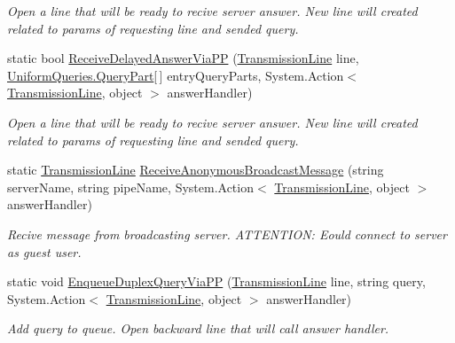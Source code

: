 \begin{DoxyCompactItemize}
\begin{DoxyCompactList}\small\item\em Open a line that will be ready to recive server answer. New line will created related to params of requesting line and sended query. \end{DoxyCompactList}\item 
static bool \mbox{\hyperlink{class_uniform_client_1_1_base_client_a4db768d7c09862ab9adc9d7b0638edc6}{Receive\+Delayed\+Answer\+Via\+PP}} (\mbox{\hyperlink{class_pipes_provider_1_1_client_1_1_transmission_line}{Transmission\+Line}} line, \mbox{\hyperlink{struct_uniform_queries_1_1_query_part}{Uniform\+Queries.\+Query\+Part}}\mbox{[}$\,$\mbox{]} entry\+Query\+Parts, System.\+Action$<$ \mbox{\hyperlink{class_pipes_provider_1_1_client_1_1_transmission_line}{Transmission\+Line}}, object $>$ answer\+Handler)
\begin{DoxyCompactList}\small\item\em Open a line that will be ready to recive server answer. New line will created related to params of requesting line and sended query. \end{DoxyCompactList}\item 
static \mbox{\hyperlink{class_pipes_provider_1_1_client_1_1_transmission_line}{Transmission\+Line}} \mbox{\hyperlink{class_uniform_client_1_1_base_client_a740568ca68dbd6bcdf099d572347ceb6}{Receive\+Anonymous\+Broadcast\+Message}} (string server\+Name, string pipe\+Name, System.\+Action$<$ \mbox{\hyperlink{class_pipes_provider_1_1_client_1_1_transmission_line}{Transmission\+Line}}, object $>$ answer\+Handler)
\begin{DoxyCompactList}\small\item\em Recive message from broadcasting server. A\+T\+T\+E\+N\+T\+I\+ON\+: Eould connect to server as guest user. \end{DoxyCompactList}\item 
static void \mbox{\hyperlink{class_uniform_client_1_1_base_client_a964bd521f46fd99f64b10257c5d233ef}{Enqueue\+Duplex\+Query\+Via\+PP}} (\mbox{\hyperlink{class_pipes_provider_1_1_client_1_1_transmission_line}{Transmission\+Line}} line, string query, System.\+Action$<$ \mbox{\hyperlink{class_pipes_provider_1_1_client_1_1_transmission_line}{Transmission\+Line}}, object $>$ answer\+Handler)
\begin{DoxyCompactList}\small\item\em Add query to queue. Open backward line that will call answer handler. \end{DoxyCompactList}\item 

\end{DoxyCompactItemize}
